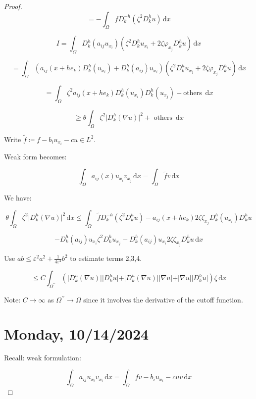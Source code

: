 \documentclass{article}
\theoremstyle{definition}
\begin{document}
\begin{proof}
    \[
        = - \int_{\Omega} f D_k^{-h} (\zeta^2 D_k^h u) \,\mathrm{d}x 
    \]

    \[
        I = \int_{\Omega} D_k^h (a_{ij}u_{x_i}) \left( \zeta^2 D_k^h u_{x_i} + 2 \zeta \varphi_{x_j} D_k^h u \right)  \,\mathrm{d}x 
    \]

    \[
        = \int_{\Omega} \left( a_{ij}(x+he_k) D_k^h(u_{x_i}) + D_k^h (a_{ij})u_{x_i} \right) \left( \zeta^2 D_k^h u_{x_j} + 2 \zeta \varphi_{x_j}D_k^h u \right)  \,\mathrm{d}x 
    \]

    \[
        = \int_{\Omega} \zeta^2 a_{ij}(x+he_k) D_k^h (u_{x_i}) D_k^h (u_{x_j}) + \text{others } \,\mathrm{d}x 
    \]

    \[
        \geq \theta \int_{\Omega} \zeta^2 \vert D_k^h (\nabla u) \vert ^ 2 + \text{ others }  \,\mathrm{d}x 
    \]

    Write \(\tilde{f} \coloneqq f - b_i u_{x_i} - cu \in L^2\).

    Weak form becomes:

    \[
        \int_{\Omega} a_{ij}(x) u_{x_i} v_{x_j} \,\mathrm{d}x = \int_{\Omega} \tilde{f}v \,\mathrm{d}x 
    \]

    We have:

    \[
        \theta \int_{\Omega} \zeta ^2 \vert D_k^h (\nabla u) \vert ^2 \,\mathrm{d}x \leq \int_{\Omega} \tilde{f} D_k^{-h} (\zeta^2 D_k^h u) - a_{ij}(x+he_k) 2 \zeta \zeta _{x_j} D_k^h(u_{x_i})D_k^h u  
    \]
    
    \[
        - D_k^h (a_{ij})u_{x_i}\zeta^2 D_k^h u_{x_j} - D_k^h (a_{ij}) u_{x_i} 2 \zeta \zeta_{x_j} D_k^h u \,\mathrm{d}x 
    \]

    Use \(ab \leq \varepsilon^2 a^2 + \frac{1}{4 \varepsilon^2} b^2\) to estimate terms 2,3,4.

    \[
        \leq C \int_{\Omega^{\prime\prime} } \left( \vert D_k^h (\nabla u) \vert \vert D_k^h u \vert + \vert D^h_k (\nabla u) \vert \vert \nabla u \vert + \vert \nabla u \vert \vert D_k^h u \vert \right) \zeta \,\mathrm{d}x 
    \]

    Note: \(C \to \infty \) as \(\Omega ^{\prime\prime} \to \Omega\) since it involves the derivative of the cutoff function.

\section*{Monday, 10/14/2024}

Recall: weak formulation:

\[
    \int_{\Omega} a_{ij} u_{x_i} v_{x_i} \,\mathrm{d}x = \int_{\Omega} fv - b_i u_{x_i} - cuv \,\mathrm{d}x 
\]


\end{proof}
\end{document}

